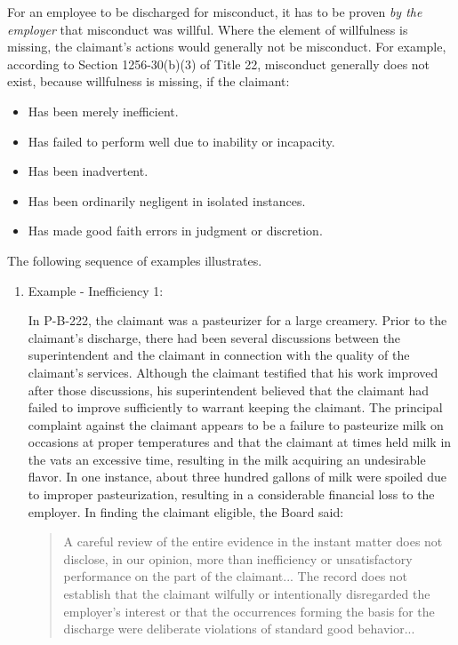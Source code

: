 \documentclass[12pt]{article}
\newcommand{\1}{\mathbf{1}}
\begin{document}
\begin{appendix}
\smallskip

For an employee to be discharged for misconduct, it has to be proven \emph{by the employer} that misconduct was willful. Where the element of willfulness is missing, the claimant's actions would generally not be misconduct. For example, according to Section 1256-30(b)(3) of Title 22, misconduct generally does not exist, because willfulness is missing, if the claimant:
\begin{itemize}
\item Has been merely inefficient.
\item Has failed to perform well due to inability or incapacity.
\item Has been inadvertent.
\item Has been ordinarily negligent in isolated instances.
\item Has made good faith errors in judgment or discretion.
\end{itemize}

The following sequence of examples illustrates.

\begin{enumerate}

\item Example - Inefficiency 1:

In P-B-222, the claimant was a pasteurizer for a large creamery. Prior to the claimant's discharge, there had been several discussions between the superintendent and the claimant in connection with the quality of the claimant's services. Although the claimant testified that his work improved after those discussions, his superintendent believed that the claimant had failed to improve sufficiently to warrant keeping the claimant. The principal complaint against the claimant appears to be a failure to pasteurize milk on occasions at proper temperatures and that the claimant at times held milk in the vats an excessive time, resulting in the milk acquiring an undesirable flavor. In one instance, about three hundred gallons of milk were spoiled due to improper pasteurization, resulting in a considerable financial loss to the employer. In finding the claimant eligible, the Board said:
\begin{quotation}
A careful review of the entire evidence in the instant matter does not disclose, in our opinion, more than inefficiency or unsatisfactory performance on the part of the claimant...  The record does not establish that the claimant wilfully or intentionally disregarded the employer's interest or that the occurrences forming the basis for the discharge were deliberate violations of standard good behavior...
\end{quotation}


\end{enumerate}
\end{appendix}
\end{document}
